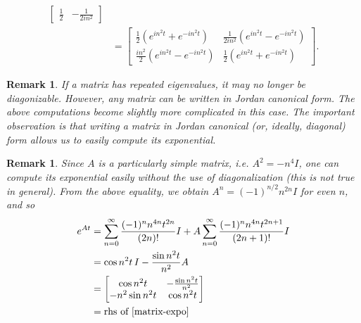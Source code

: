 \documentclass[12pt,reqno]{amsart}
\numberwithin{equation}{section}  %
\renewcommand{\cref}{\Cref}
\newtheorem{remark}[theorem]{Remark}
\begin{document}
\begin{appendices}
\begin{equation}
\begin{split}
\begin{bmatrix}
    \frac{1}{2} & -\frac{1}{2i n^{2}}
  \end{bmatrix}
  \\
  & =
  \begin{bmatrix}
    \frac{1}{2}(e^{in^{2}t} + e^{-in^{2}t}) & \frac{1}{2 i n^{2}} (e^{in^{2}t} -
    e^{-in^{2}t})    \\
    \frac{in^{2}}{2}(e^{in^{2}t} - e^{-in^{2}t}) & \frac{1}{2}(e^{in^{2}t} +
    e^{-in^{2}t})
  \end{bmatrix}.
\end{split}
\end{equation}
%
%
\begin{framed}
\begin{remark}
If a matrix has repeated eigenvalues, it may no longer be diagonizable. However,
any matrix can be written in Jordan canonical form. The above computations
become slightly more complicated in this case. The important observation is that
writing a matrix in Jordan canonical (or, ideally, diagonal) form allows us to
easily compute its exponential. 
\label{rem:jordan-form}
\end{remark}
\end{framed}
%
%
%
%
\begin{framed}
\begin{remark}
\label{rem:simpler-comp}
  Since $A$ is a particularly simple matrix, i.e. $A^{2} = -n^{4} I$, one can
  compute its exponential easily without the use of diagonalization (this is
  not true in general). From the above equality, we obtain $A^{n} =
  (-1)^{n/2} n^{2n} I$ for even $n$, and so
  \begin{equation*}
  \begin{split}
    e^{At}
    & = \sum_{n=0}^{\infty} \frac{(-1)^{n}n^{4n}t^{2n}}{(2n)!}I + A
    \sum_{n=0}^{\infty} \frac{(-1)^{n} n^{4n} t^{2n + 1}}{(2n + 1)!} I 
    \\
    & = \cos n^{2}t \, I - \frac{\sin n^{2}t}{n^{2}}A
    \\
    & = 
    \begin{bmatrix}
      \cos n^{2}t &  -\frac{\sin n^{2}t}{n^{2}}
      \\
      - n^{2} \sin n^{2}t & \cos n^{2}t
    \end{bmatrix}
    \\
    & = \text{rhs of} \ \cref{matrix-expo}
  \end{split}
  \end{equation*}
\end{remark}
\end{framed}

\end{appendices}
\end{document}
